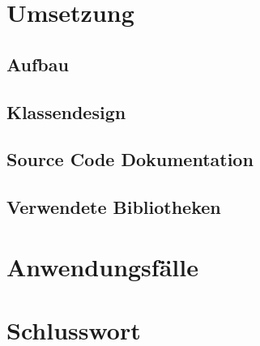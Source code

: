 \documentclass[a4paper,12pt]{article}
\begin{document}
\section{Umsetzung}

\subsection{Aufbau}

\subsection{Klassendesign}

\subsection{Source Code Dokumentation}

\subsection{Verwendete Bibliotheken}

\section{Anwendungsfälle}

\section{Schlusswort}
\end{document}
